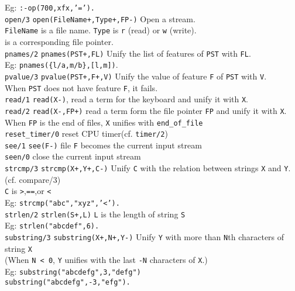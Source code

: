\begin{tabbing}
	\> Eg: {\tt :-op(700,xfx,'=').}\\
{\tt open/3}	\> {\tt open(FileName+,Type+,FP-)} Open a stream.\\
	\> {\tt FileName} is a file name. {\tt Type} is {\tt r} (read) 
or {\tt w} (write). \\
	 is a corresponding file pointer.\\
{\tt pnames/2} \> {\tt pnames(PST+,FL)} Unify the list of features of
{\tt PST} with {\tt FL}.\\
	\> Eg: {\tt pnames(\{l/a,m/b\},[l,m])}.\\
{\tt pvalue/3} \> {\tt pvalue(PST+,F+,V)} Unify the value of feature
{\tt F} of {\tt PST} with {\tt V}.\\
	\> When {\tt PST} does not have feature {\tt F}, it fails.\\
{\tt read/1}	\> {\tt read(X-)}, read a term for the keyboard and unify it with {\tt X}.\\
{\tt read/2}	\> {\tt read(X-,FP+)} read a term form the file
pointer {\tt FP} and unify it with {\tt X}.\\
	\> When {\tt FP} is the end of files, {\tt X} unifies with
{\tt end\_of\_file}\\
{\tt reset\_timer/0} \> reset CPU timer(cf. {\tt timer/2})\\
{\tt see/1}	\> {\tt see(F-)} file {\tt F} becomes the current input
stream\\
{\tt seen/0}	\> close the current input stream\\
{\tt strcmp/3} \> {\tt strcmp(X+,Y+,C-)} Unify {\tt C} with the
relation between strings {\tt X} and {\tt Y}. (cf. compare/3)\\
	\> {\tt C} is \verb->-,\verb-==-,or \verb-<-\\	
	\> Eg: {\tt strcmp("abc","xyz",'<').}\\
{\tt strlen/2}	\> {\tt strlen(S+,L)} {\tt L} is the length of string
{\tt S}\\
	\> Eg: {\tt strlen("abcdef",6).}\\
{\tt substring/3}\> {\tt substring(X+,N+,Y-)} Unify {\tt Y} with 
more than {\tt N}th characters of string {\tt X}\\
	\>(When {\tt N < 0}, {\tt Y} unifies with the last {\tt -N}
	characters of {\tt X}.)\\
	\> Eg: {\tt substring("abcdefg",3,"defg")}\\
	\> \hspace{19pt} {\tt substring("abcdefg",-3,"efg").}\\

\end{tabbing}
